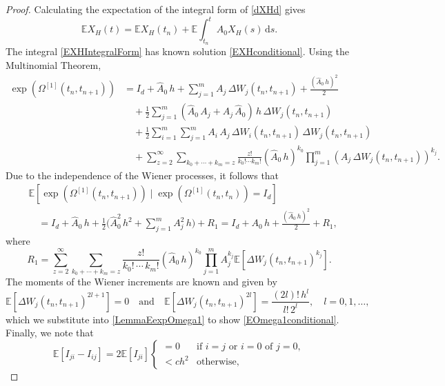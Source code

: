 \documentclass[onefignum]{siamart250211}
\begin{document}
\begin{proof}
Calculating the expectation of the integral form of \cref{dXHd} gives
\begin{equation}\mathbb{E}X_H(t)=\mathbb{E}X_H(t_n)+\mathbb{E}\int_{t_n}^tA_0X_H(s)\,\mathrm{d}s.\label{EXHIntegralForm}\end{equation}
The integral \cref{EXHIntegralForm} has known solution \cref{EXHconditional}. Using the Multinomial Theorem,
\begin{align*}
\exp\left(\Omega^{[1]}(t_n,t_{n+1})\right)&=I_d+\hat{A}_0\,h+\sum_{j=1}^mA_j\,\Delta W_j(t_n,t_{n+1})+\frac{\left(\hat{A}_0\,h\right)^2}{2}\\
&\quad+\frac{1}{2}\sum_{j=1}^m\left(\hat{A}_0\,A_j+A_j\,\hat{A}_0\right)\,h\,\Delta W_j(t_n,t_{n+1})\\
&\quad+\frac{1}{2}\sum_{i=1}^m\sum_{j=1}^mA_i\,A_j\,\Delta W_i(t_n,t_{n+1})\,\Delta W_j(t_n,t_{n+1})\\
&\quad+\sum_{z=2}^\infty\sum_{k_0+\cdots+k_m=z}\!\frac{z!}{k_0!\cdots k_m!}\!\left(\!\hat{A}_0\,h\!\right)^{k_0}\prod_{j=1}^m\left(A_j\,\Delta W_j(t_n,t_{n+1})\right)^{k_j}.
\end{align*}
Due to the independence of the Wiener processes, it follows that
\begin{align}
&\mathbb{E}\left[\exp\left(\Omega^{[1]}(t_n,t_{n+1})\right)\mid\exp\left(\Omega^{[1]}(t_n,t_n)\right)=I_d\right]\nonumber\\
&\quad=I_d+\hat{A}_0\,h+\frac{1}{2}\bigg(\hat{A}_0^2\,h^2+\sum_{j=1}^m A_j^2\,h\bigg)+R_1=I_d+A_0\,h+\frac{\left(\hat{A}_0\,h\right)^2}{2}+R_1,\label{LemmaEexpOmega1}
\end{align}
where
\[R_1=\sum_{z=2}^\infty\sum_{k_0+\cdots+k_m=z}\frac{z!}{k_0!\,\cdots\,k_m!}\left(\hat{A}_0\,h\right)^{k_0}\prod_{j=1}^mA_j^{k_j}\mathbb{E}\left[\Delta W_j(t_n,t_{n+1})^{k_j}\right].\]
The moments of the Wiener increments are known and given by
\[\mathbb{E}\left[\Delta W_j(t_n,t_{n+1})^{2l+1}\right]=0\quad\textrm{and}\quad\mathbb{E}\left[\Delta W_j(t_n,t_{n+1})^{2l}\right]=\frac{(2l)!\,h^l}{l!\,2^l},\quad l=0,1,\ldots,\]
which we substitute into \cref{LemmaEexpOmega1} to show \cref{EOmega1conditional}. Finally, we note that
\begin{equation}\mathbb{E}[I_{ji}-I_{ij}]=2\mathbb{E}[I_{ji}]\begin{cases}=0&\textrm{if }i=j\textrm{ or }i=0\textrm{ of }j=0,\\ <ch^2&\mathrm{otherwise},\end{cases}\label{EIji}\end{equation}

\end{proof}
\end{document}
